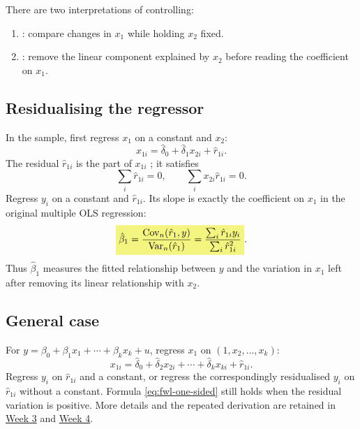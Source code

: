There are two interpretations of controlling:
\begin{enumerate}
\item {}: compare changes in $x_1$ while holding $x_2$ fixed.
\item {}: remove the linear component explained by $x_2$ before reading the coefficient on $x_1$.
\end{enumerate}

\subsection{Residualising the regressor}
In the sample, first regress $x_1$ on a constant and $x_2$:
\begin{equation}\label{eq:fwl-x}
x_{1i}=\hat\delta_0+\hat\delta_1x_{2i}+\hat r_{1i}.
\end{equation}
The residual $\hat r_{1i}$ is the part of $x_{1i}$ ; it satisfies
\[\sum_i\hat r_{1i}=0,\qquad\sum_i x_{2i}\hat r_{1i}=0.\]
Regress $y_i$ on a constant and $\hat r_{1i}$. Its slope is exactly the coefficient on $x_1$ in the original multiple OLS regression:
\begin{equation}\label{eq:fwl-one-sided}
\hm{\hat\beta_1=
\frac{\Cov_n(\hat r_1,y)}{\Var_n(\hat r_1)}
=\frac{\sum_i\hat r_{1i}y_i}{\sum_i\hat r_{1i}^2}}.
\end{equation}
Thus $\hat\beta_1$ measures the fitted relationship between $y$ and the variation in $x_1$ left after removing its linear relationship with $x_2$. 


\subsection{General case}
For $y=\beta_0+\beta_1x_1+\cdots+\beta_kx_k+u$, regress $x_1$ on $(1,x_2,\ldots,x_k)$:
\[x_{1i}=\hat\delta_0+\hat\delta_2x_{2i}+\cdots+\hat\delta_kx_{ki}+\hat r_{1i}.\]
Regress $y_i$ on $\hat r_{1i}$ and a constant, or regress the correspondingly residualised $y_i$ on $\hat r_{1i}$ without a constant. Formula \eqref{eq:fwl-one-sided} still holds when the residual variation is positive. More details and the repeated derivation are retained in \hyperref[sec:fwl-week3]{Week 3} and \hyperref[sec:fwl-week4]{Week 4}.

